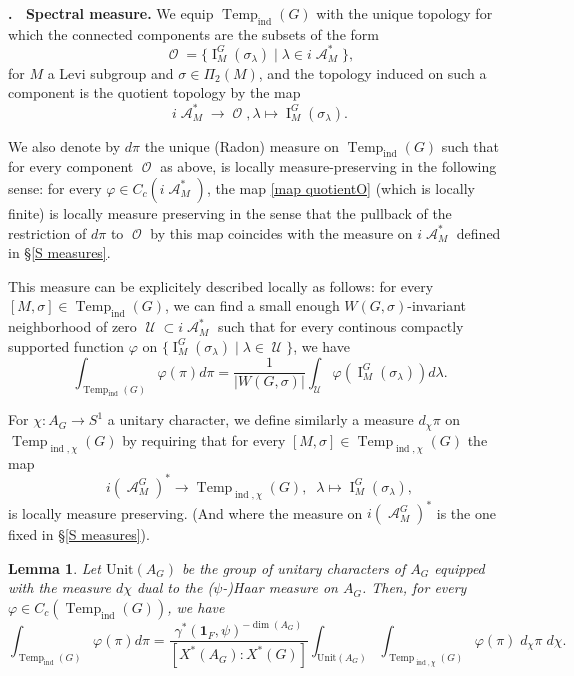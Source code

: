 \documentclass[12pt]{article}
\newenvironment{paragr}[1][]{\refstepcounter{subsubsection} \noindent \textbf{\thesubsubsection . \ #1}}{\medskip}
\newtheorem{lem}{Lemma}[section]
\numberwithin{equation}{section}
\def\Unit{\mathrm{Unit}}
\DeclareMathOperator{\Temp}{Temp}
\DeclareMathOperator{\cA}{\mathcal{A}}
\DeclareMathOperator{\ind}{ind}
\DeclareMathOperator{\cU}{\mathcal{U}}
\DeclareMathOperator{\cO}{\mathcal{O}}
\DeclareMathOperator{\rI}{\mathrm{I}}
\begin{document}
	\begin{paragr}[Spectral measure.]\label{S spectral measure}
		We equip $\Temp_{\ind}(G)$ with the unique topology for which the connected components are the subsets of the form
		$$\displaystyle \cO=\{\rI_M^G(\sigma_\lambda)\mid \lambda\in i\cA_M^* \},$$
		for $M$ a Levi subgroup and $\sigma\in \Pi_2(M)$, and the topology induced on such a component is the quotient topology by the map 
		\begin{equation}\label{map quotientO}
		\displaystyle i\cA_M^*\to \cO, \lambda\mapsto \rI_M^G(\sigma_\lambda).
		\end{equation}
		
		We also denote by $d\pi$ the unique (Radon) measure on $\Temp_{\ind}(G)$ such that for every component $\cO$ as above,
		is locally measure-preserving in the following sense: for every $\varphi\in C_c(i\cA_M^*)$, the map \eqref{map quotientO} (which is locally finite) is locally measure preserving in the sense that the pullback of the restriction of $d\pi$ to $\cO$ by this map  coincides with the measure on $i\cA_M^*$ defined in \S \ref{S measures}.
		 
		
		This measure can be explicitely described locally as follows: for every $[M,\sigma]\in \Temp_{\ind}(G)$, we can find a small enough $W(G,\sigma)$-invariant neighborhood of zero $\cU\subset i\cA_M^*$ such that for every continous compactly supported function $\varphi$ on $\{\rI_M^G(\sigma_\lambda)\mid \lambda\in \cU \}$, we have
		\begin{equation*}
		\displaystyle \int_{\Temp_{\ind}(G)} \varphi(\pi)d\pi=\frac{1}{\lvert W(G,\sigma)\rvert}\int_{\cU} \varphi(\rI_M^G(\sigma_\lambda)) d\lambda.
		\end{equation*}

		For $\chi:A_G\to S^1$ a unitary character, we define similarly a measure $d_{\chi}\pi$ on $\Temp_{\ind,\chi}(G)$ by requiring that for every $[M,\sigma]\in \Temp_{\ind,\chi}(G)$ the map
		$$\displaystyle i(\cA_M^G)^*\to \Temp_{\ind,\chi}(G), \;\; \lambda\mapsto \rI_M^G(\sigma_\lambda),$$
		is locally measure preserving. (And where the measure on $i(\cA_M^G)^*$ is the one fixed in \S \ref{S measures}).
	
	
	\begin{lem}\label{lem spectral measures}
	Let $\Unit(A_G)$ be the group of unitary characters of $A_G$ equipped with the measure $d\chi$ dual to the ($\psi$-)Haar measure on $A_G$. Then, for every $\varphi\in C_c(\Temp_{\ind}(G))$, we have
	\begin{equation*}
	\displaystyle \int_{\Temp_{\ind}(G)} \varphi(\pi)d\pi=\frac{\gamma^*(\mathbf{1}_F,\psi)^{-\dim(A_G)}}{[X^*(A_G):X^*(G)]}\int_{\Unit(A_G)} \int_{\Temp_{\ind,\chi}(G)} \varphi(\pi)\; d_\chi\pi\; d\chi.
	\end{equation*}
	\end{lem}


\end{paragr}
\end{document}

